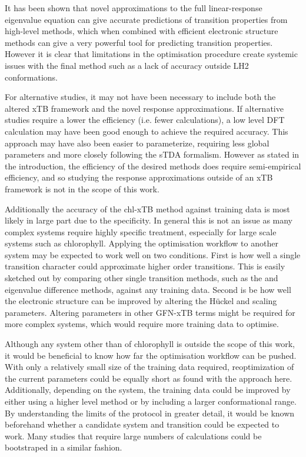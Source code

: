 It has been shown that novel approximations to the full linear-response eigenvalue
equation can give accurate predictions of transition properties from high-level 
methods, which when combined with efficient electronic structure methods can give
a very powerful tool for predicting transition properties. However it is clear that
limitations in the optimisation procedure create systemic issues with the final
method such as a lack of accuracy outside LH2 conformations.

For alternative studies, it may not have been necessary to include both the altered 
xTB framework and the novel response approximations. If alternative studies require
a lower the efficiency (i.e. fewer calculations), a low level DFT calculation may 
have been good enough to achieve the required accuracy. This approach may have also
been easier to parameterize, requiring less global parameters and more closely following
the sTDA formalism. However as stated in the introduction, the efficiency of the 
desired methods does require semi-empirical efficiency, and so studying the response
approximations outside of an xTB framework is not in the scope of this work.

Additionally the accuracy of the chl-xTB method against training data is most likely
in large part due to the specificity. In general this is not an issue as many complex
systems require highly specific treatment, especially for large scale systems such
as chlorophyll. Applying the optimisation workflow to another system may be expected
to work well on two conditions. First is how well a single transition character
could approximate higher order transitions. This is easily sketched out by comparing
other single transition methods, such as the \dscf and eigenvalue difference methods,
against any training data. Second is be how well the electronic structure can be 
improved by altering the H{\"u}ckel and scaling parameters. Altering parameters
in other GFN-xTB terms might be required for more complex systems, which would require
more training data to optimise.

Although any system other than of chlorophyll is outside the scope of this work, 
it would be beneficial to know how far the optimisation workflow can be pushed. 
With only a relatively small size of the training data required, reoptimization 
of the current parameters could be equally short as found with the approach here. 
Additionally, depending on the system, the training data could be improved by either
using a higher level method or by including a larger conformational range. By understanding
the limits of the protocol in greater detail, it would be known beforehand whether 
a candidate system and transition could be expected to work. Many studies that require
large numbers of calculations could be bootstraped in a similar fashion.

